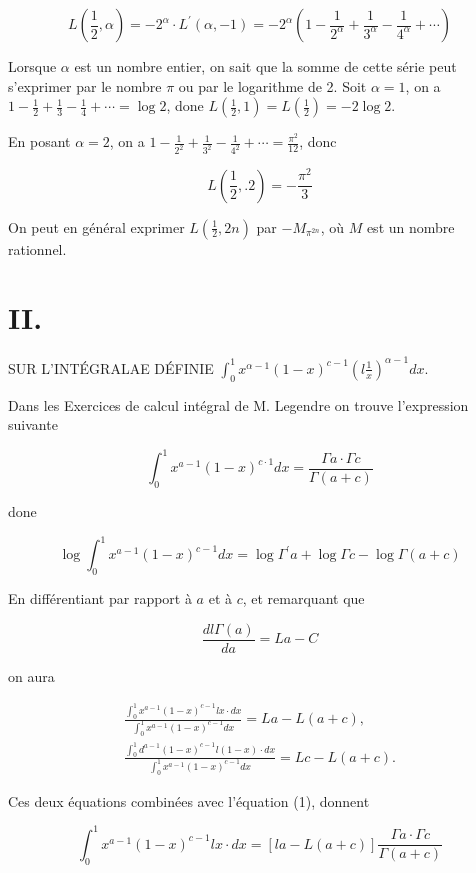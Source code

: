\documentclass{article}
\begin{document}
\[
L\left(\frac{1}{2}, \alpha\right)=-2^{\alpha} \cdot L^{\prime}(\alpha,-1)=-2^{\alpha}\left(1-\frac{1}{2^{\alpha}}+\frac{1}{3^{\alpha}}-\frac{1}{4^{\alpha}}+\cdots\right)
\]

Lorsque \(\alpha\) est un nombre entier, on sait que la somme de cette série peut s'exprimer par le nombre \(\pi\) ou par le logarithme de 2. Soit \(\alpha=1\), on a \(1-\frac{1}{2}+\frac{1}{3}-\frac{1}{4}+\cdots=\log 2\), done \(L\left(\frac{1}{2}, 1\right)=L\left(\frac{1}{2}\right)=-2 \log 2\).

En posant \(\alpha=2\), on a \(1-\frac{1}{2^{2}}+\frac{1}{3^{2}}-\frac{1}{4^{2}}+\cdots=\frac{\pi^{2}}{12}\), donc

\[
L\left(\frac{1}{2}, .2\right)=-\frac{\pi^{2}}{3}
\]

On peut en général exprimer \(L\left(\frac{1}{2}, 2 n\right)\) par \(-M_{\pi^{2 n}}\), où \(M\) est un nombre rationnel.

\section*{II.}

SUR L'INTÉGRALAE DÉFINIE \(\int_{0}^{1} x^{\alpha-1}(1-x)^{c-1}\left(l \frac{1}{x}\right)^{\alpha-1} d x\).

Dans les Exercices de calcul intégral de M. Legendre on trouve l'expression suivante

\[
\int_{0}^{1} x^{a-1}(1-x)^{c \cdot 1} d x=\frac{\Gamma a \cdot \Gamma c}{\Gamma(a+c)}
\]

done

\[
\log \int_{0}^{1} x^{a-1}(1-x)^{c-1} d x=\log \Gamma^{\prime} a+\log \Gamma c-\log \Gamma(a+c)
\]

En différentiant par rapport à \(a\) et à \(c\), et remarquant que

\[
\frac{d l \Gamma(a)}{d a}=L a-C
\]

on aura

\[
\begin{gathered}
\frac{\int_{0}^{1} x^{a-1}(1-x)^{c-1} l x \cdot d x}{\int_{0}^{1} x^{a-1}(1-x)^{c-1} d x}=L a-L(a+c), \\
\frac{\int_{0}^{1} d^{a-1}(1-x)^{c-1} l(1-x) \cdot d x}{\int_{0}^{1} x^{a-1}(1-x)^{c-1} d x}=L c-L(a+c) .
\end{gathered}
\]

Ces deux équations combinées avec l'équation (1), donnent

\[
\int_{0}^{1} x^{a-1}(1-x)^{c-1} l x \cdot d x=[l a-L(a+c)] \frac{\Gamma a \cdot \Gamma c}{\Gamma(a+c)}
\]
\end{document}
